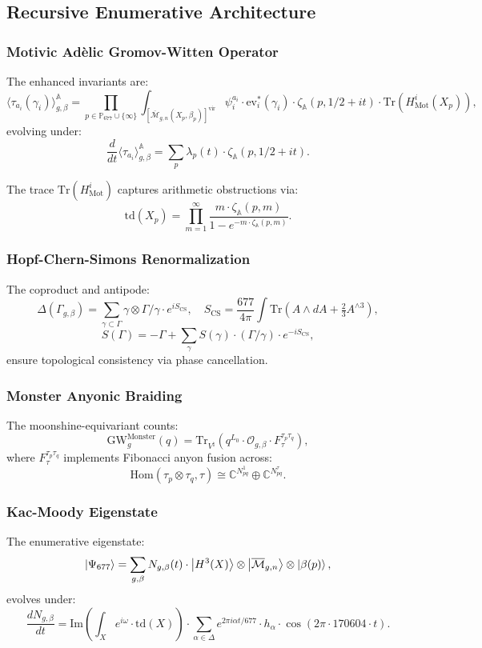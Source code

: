 \documentclass[12pt]{article}
\begin{document}
\begin{center}
\subsection{Recursive Enumerative Architecture}
\subsubsection{Motivic Adèlic Gromov-Witten Operator}
The enhanced invariants are:
\[
\langle \tau_{a_i}(\gamma_i) \rangle_{g,\beta}^{\mathbb{A}} = \prod_{p \in \mathbb{P}_{677} \cup \{\infty\}} \int_{[\overline{\mathcal{M}}_{g,n}(X_p,\beta_p)]^{\text{vir}}} \psi_i^{a_i} \cdot \text{ev}_i^*(\gamma_i) \cdot \zeta_{\mathbb{A}}(p, 1/2 + i t) \cdot \text{Tr}(H^i_{\text{Mot}}(X_p)),
\]
evolving under:
\[
\frac{d}{dt} \langle \tau_{a_i} \rangle_{g,\beta}^{\mathbb{A}} = \sum_p \lambda_p(t) \cdot \zeta_{\mathbb{A}}(p, 1/2 + i t).
\]
\begin{remark}
The trace $\text{Tr}(H^i_{\text{Mot}})$ captures arithmetic obstructions via:
\[
\text{td}(X_p) = \prod_{m=1}^{\infty} \frac{m \cdot \zeta_{\mathbb{A}}(p, m)}{1 - e^{-m \cdot \zeta_{\mathbb{A}}(p, m)}}.
\]
\end{remark}

\subsubsection{Hopf-Chern-Simons Renormalization}
The coproduct and antipode:
\[
\Delta(\Gamma_{g,\beta}) = \sum_{\gamma \subset \Gamma} \gamma \otimes \Gamma/\gamma \cdot e^{i S_{\text{CS}}}, \quad S_{\text{CS}} = \frac{677}{4\pi} \int \text{Tr}(A \wedge dA + \tfrac{2}{3}A^{\wedge 3}),
\]
\[
S(\Gamma) = - \Gamma + \sum_{\gamma} S(\gamma) \cdot (\Gamma/\gamma) \cdot e^{-i S_{\text{CS}}},
\]
ensure topological consistency via phase cancellation.

\subsubsection{Monster Anyonic Braiding}
The moonshine-equivariant counts:
\[
\text{GW}_g^{\text{Monster}}(q) = \text{Tr}_{V^\natural}(q^{L_0} \cdot \mathcal{O}_{g,\beta} \cdot F^{\tau_p \tau_q}_\tau),
\]
where $F^{\tau_p \tau_q}_\tau$ implements Fibonacci anyon fusion across:
\[
\text{Hom}(\tau_p \otimes \tau_q, \tau) \cong \mathbb{C}^{N_{pq}^1} \oplus \mathbb{C}^{N_{pq}^\tau}.
\]

\subsubsection{Kac-Moody Eigenstate}
The enumerative eigenstate:
\[
\ket{\Psi_{677}} = \sum_{g,\beta} N_{g,\beta}(t) \cdot \ket{H^3(X)} \otimes \ket{\overline{\mathcal{M}}_{g,n}} \otimes \ket{\beta(p)},
\]
evolves under:
\[
\frac{dN_{g,\beta}}{dt} = \text{Im} \left( \int_X e^{i\omega} \cdot \text{td}(X) \right) \cdot \sum_{\alpha \in \Delta} e^{2\pi i \alpha t / 677} \cdot h_\alpha \cdot \cos(2\pi \cdot 170604 \cdot t).
\]


\end{center}
\end{document}
